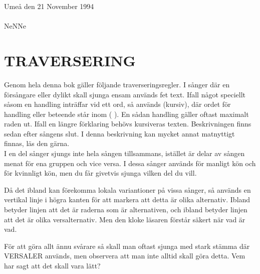 \documentclass[a6paper,fontsize=10pt,twoside,open=right]{scrbook}
\newcommand*\cleartoleftpage{%
  \clearpage
  \ifodd\value{page}\hbox{}\newpage\fi
}
\begin{document}
\noindent Umeå den 21 November
1994\\ \\ NeNNe
\cleartoleftpage
\section{TRAVERSERING}\vspace{10pt}
\hspace{10pt}Genom hela denna bok gäller följande
traverseringsregler. I sånger där en försångare eller dylikt skall
sjunga ensam används fet text. Ifall något speciellt såsom en handling
inträffar vid ett ord, så används (kursiv), där ordet för handling
eller beteende står inom ( ). En sådan handling gäller oftast maximalt
raden ut. Ifall en längre förklaring behövs kursiveras
texten. Beskrivningen finns sedan efter sångens slut. I denna
beskrivning kan mycket annat matnyttigt finnas, läs den
gärna.\\ \indent I en del sånger sjungs inte hela sången tillsammans,
istället är delar av sången menat för ena gruppen och vice versa. I
dessa sånger används {\Large\Male} för manligt kön och {\Large\Female}
för kvinnligt kön, men du får givetvis sjunga vilken del du vill.
\begin{leftborder}
  \hspace{10pt}Då det ibland kan förekomma lokala variantioner på vissa sånger, så
  används en  vertikal linje i högra kanten för att markera att detta
  är olika alternativ. Ibland betyder linjen att det är raderna som är
  alternativen, och ibland betyder linjen att det är olika
  versalternativ. Men den kloke läsaren förstår säkert när vad är vad.
\end{leftborder}
\hspace{15pt} För att göra allt ännu svårare så skall man oftast sjunga med stark
stämma där VERSALER används, men observera att man inte alltid skall
göra detta. Vem har sagt att det skall vara lätt?
\newpage
\cleardoublepage
\renewcommand{\contentsname}{\vspace{-2.17cm}\rmfamily{\fontsize{13}{15}\textbf{INNEHÅLL}}\vspace{-1.2cm}}
\tableofcontents

\renewcommand{\leftmark}{}
\end{document}
